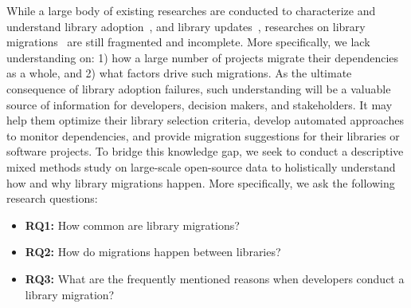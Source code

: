 \documentclass[sigconf, screen]{acmart}
\begin{document}
While a large body of existing researches are conducted to characterize and understand library adoption~\cite{pano2018factors, de2018empirical, kavaler2019tool, yin2020team, larios2020selecting, ma2020methodology, xu2020reinventing, lamba2020heard},
and library updates~\cite{cox2015measuring, kula2015trusting, bavota2015apache, mirhosseini2017can, kula2018developers, zerouali2018empirical, decan2018evolution, cogo2019empirical, soto2019emergence, dietrich2019dependency, zimmermann2019small}, 
researches on library migrations~\cite{bartolomei2009study, bartolomei2010swing, kabinna2016logging, alrubaye2020does, teyton2012mining, teyton2014study} are still %
fragmented and incomplete.
More specifically, we lack understanding on: 1) how a large number of projects migrate their dependencies as a whole, and 2) what factors drive such migrations.
As the ultimate consequence of library adoption failures, such understanding will be a valuable source of information for developers, decision makers, and stakeholders.
It may help them optimize their library selection criteria, develop automated approaches to monitor dependencies, and provide migration suggestions for their libraries or software projects.
To bridge this knowledge gap, we seek to conduct a descriptive mixed methods study on large-scale open-source data to holistically understand how and why library migrations happen. More specifically, we ask the following research questions:
\begin{itemize}
    \item \textbf{RQ1:} How common are library migrations?
    \item \textbf{RQ2:} How do migrations happen between libraries?
    \item \textbf{RQ3:} What are the frequently mentioned reasons when developers conduct a library migration?
\end{itemize}
\end{document}
